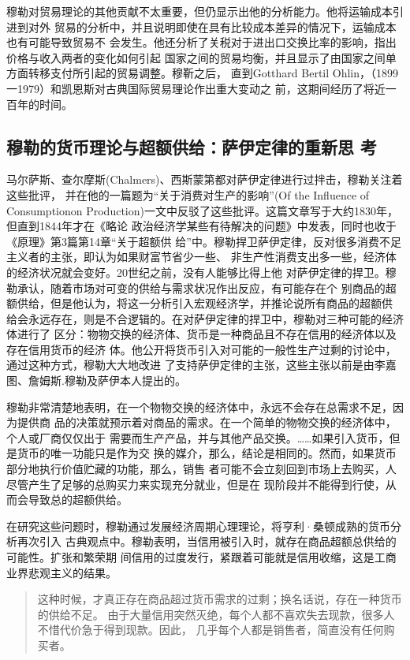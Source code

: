 穆勒对贸易理论的其他贡献不太重要，但仍显示出他的分析能力。他将运输成本引进到对外
贸易的分析中，并且说明即使在具有比较成本差异的情况下，运输成本也有可能导致贸易不
会发生。他还分析了关税对于进出口交换比率的影响，指出价格与收入两者的变化如何引起
国家之间的贸易均衡，并且显示了由国家之间单方面转移支付所引起的贸易调整。穆靳之后，
直到Gotthard Bertil Ohlin，（1899一1979）和凯恩斯对古典国际贸易理论作出重大变动之
前，这期间经历了将近一百年的时间。

\subsection[穆勒的货币理论与超额供给]{穆勒的货币理论与超额供给：萨伊定律的重新思
  考}
马尔萨斯、查尔摩斯(Chalmers)、西斯蒙第都对萨伊定律进行过拌击，穆勒关注着这些批评，
并在他的一篇题为“关于消费对生产的影响”(Of the Influence of Consumptionon
Production)一文中反驳了这些批评。这篇文章写于大约1830年，但直到1844年才在《略论
政治经济学某些有待解决的问题》中发表，同时也收于《原理》第3篇第14章“关于超额供
给”中。穆勒捍卫萨伊定律，反对很多消费不足主义者的主张，即认为如果财富节省少一些、
非生产性消费支出多一些，经济体的经济状况就会变好。20世纪之前，没有人能够比得上他
对萨伊定律的捍卫。穆勒承认，随着市场对可变的供给与需求状况作出反应，有可能存在个
别商品的超额供给，但是他认为，将这一分析引入宏观经济学，并推论说所有商品的超额供
给会永远存在，则是不合逻辑的。在对萨伊定律的捍卫中，穆勒对三种可能的经济体进行了
区分：物物交换的经济体、货币是一种商品且不存在信用的经济体以及存在信用货币的经济
体。他公开将货币引入对可能的一般性生产过剩的讨论中，通过这种方式，穆勒大大地改进
了支持萨伊定律的主张，这些主张以前是由李嘉图、詹姆斯.穆勒及萨伊本人提出的。

穆勒非常清楚地表明，在一个物物交换的经济体中，永远不会存在总需求不足，因为提供商
品的决策就预示着对商品的需求。在一个简单的物物交换的经济体中，个人或厂商仅仅出于
需要而生产产品，并与其他产品交换。……如果引入货币，但是货币的唯一功能只是作为交
换的媒介，那么，结论是相同的。然而，如果货币部分地执行价值贮藏的功能，那么，销售
者可能不会立刻回到市场上去购买，人尽管产生了足够的总购买力来实现充分就业，但是在
现阶段并不能得到行使，从而会导致总的超额供给。

在研究这些问题时，穆勒通过发展经济周期心理理论，将亨利·桑顿成熟的货币分析再次引入
古典观点中。穆勒表明，当信用被引入时，就存在商品超额总供给的可能性。扩张和繁荣期
间信用的过度发行，紧跟着可能就是信用收缩，这是工商业界悲观主义的结果。
\begin{quotation}
  这种时候，才真正存在商品超过货币需求的过剩；换名话说，存在一种货币的供给不足。
  由于大量信用突然灭绝，每个人都不喜欢失去现款，很多人不惜代价急于得到现款。因此，
  几乎每个人都是销售者，简直没有任何购买者。
\end{quotation}

